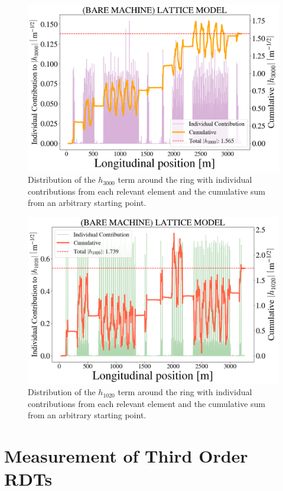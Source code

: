 \begin{figure}[H]
    \centering
    \includegraphics[width=0.88\columnwidth]{chapter4/h3000_bare.png}
    \caption{Distribution of the $h_{3000}$ term around the ring with individual contributions from each relevant element and the cumulative sum from an arbitrary starting point.}
    \label{fig:h3000bare}
\end{figure}

\begin{figure}[H]
    \centering
    \includegraphics[width=0.88\columnwidth]{chapter4/h1020_bare.png}
    \caption{Distribution of the $h_{1020}$ term around the ring with individual contributions from each relevant element and the cumulative sum from an arbitrary starting point.}
    \label{fig:h1020bare}
\end{figure}

\section{Measurement of Third Order RDTs}

